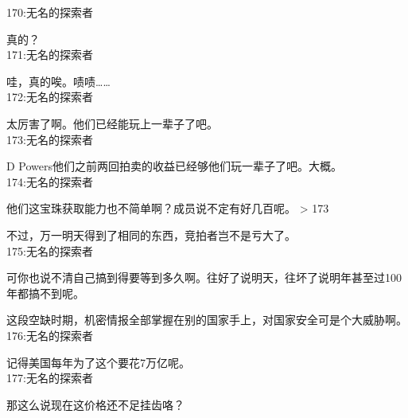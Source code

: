170:无名的探索者

真的？\\

171:无名的探索者

哇，真的唉。啧啧……\\

172:无名的探索者

太厉害了啊。他们已经能玩上一辈子了吧。\\

173:无名的探索者

D Powers他们之前两回拍卖的收益已经够他们玩一辈子了吧。大概。\\

174:无名的探索者

他们这宝珠获取能力也不简单啊？成员说不定有好几百呢。 > 173

不过，万一明天得到了相同的东西，竞拍者岂不是亏大了。\\

175:无名的探索者

可你也说不清自己搞到得要等到多久啊。往好了说明天，往坏了说明年甚至过100年都搞不到呢。

这段空缺时期，机密情报全部掌握在别的国家手上，对国家安全可是个大威胁啊。\\

176:无名的探索者

记得美国每年为了这个要花7万亿呢。\\

177:无名的探索者

那这么说现在这价格还不足挂齿咯？\\


